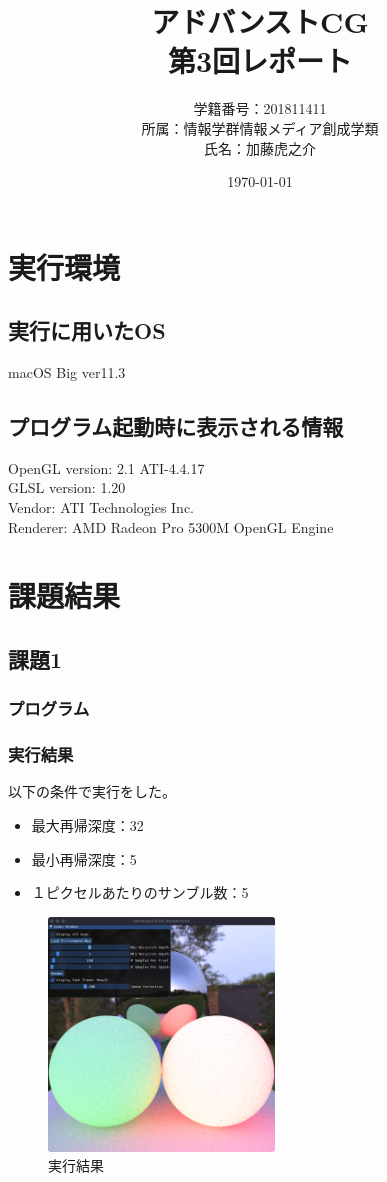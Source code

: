 \documentclass[a4paper,10pt,uplatex,dvipdfmx]{jsarticle}
\begin{document}
\title{アドバンストCG\\ \huge 第3回レポート}
\author{学籍番号：201811411\\ 所属：情報学群情報メディア創成学類\\ 氏名：加藤虎之介}
\date{\today}
\maketitle

\section{実行環境}
\subsection{実行に用いたOS}
macOS Big ver11.3

\subsection{プログラム起動時に表示される情報}
\begin{screen}
  OpenGL version: 2.1 ATI-4.4.17\\
  GLSL version: 1.20\\
  Vendor: ATI Technologies Inc.\\
  Renderer: AMD Radeon Pro 5300M OpenGL Engine
\end{screen}

\section{課題結果}
\subsection*{課題1}
\subsubsection*{プログラム}


\subsubsection*{実行結果}
以下の条件で実行をした。
\begin{itemize}
  \item 最大再帰深度：32
  \item 最小再帰深度：5
  \item １ピクセルあたりのサンブル数：5
\end{itemize}
\begin{figure}[H]
  \centering
  \includegraphics*[width=6cm]{./img/day03_32-5-100-5.png}
  \caption{実行結果}
\end{figure}
\end{document}
